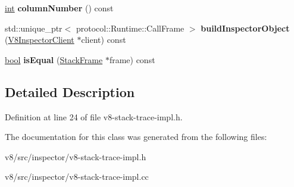 \begin{DoxyCompactItemize}
\item 
\mbox{\label{classv8__inspector_1_1StackFrame_afad6c23200e105523e5ab9c178262e93}} 
\mbox{\hyperlink{classint}{int}} {\bfseries column\+Number} () const
\item 
\mbox{\label{classv8__inspector_1_1StackFrame_a5ff8a8cb45e094492f5e0e0eb7fb51b7}} 
std\+::unique\+\_\+ptr$<$ protocol\+::\+Runtime\+::\+Call\+Frame $>$ {\bfseries build\+Inspector\+Object} (\mbox{\hyperlink{classv8__inspector_1_1V8InspectorClient}{V8\+Inspector\+Client}} $\ast$client) const
\item 
\mbox{\label{classv8__inspector_1_1StackFrame_a3ca51e48027ea3bde7320ecc293fcb89}} 
\mbox{\hyperlink{classbool}{bool}} {\bfseries is\+Equal} (\mbox{\hyperlink{classv8__inspector_1_1StackFrame}{Stack\+Frame}} $\ast$frame) const
\end{DoxyCompactItemize}


\subsection{Detailed Description}


Definition at line 24 of file v8-\/stack-\/trace-\/impl.\+h.



The documentation for this class was generated from the following files\+:\begin{DoxyCompactItemize}
\item 
v8/src/inspector/v8-\/stack-\/trace-\/impl.\+h\item 
v8/src/inspector/v8-\/stack-\/trace-\/impl.\+cc\end{DoxyCompactItemize}

